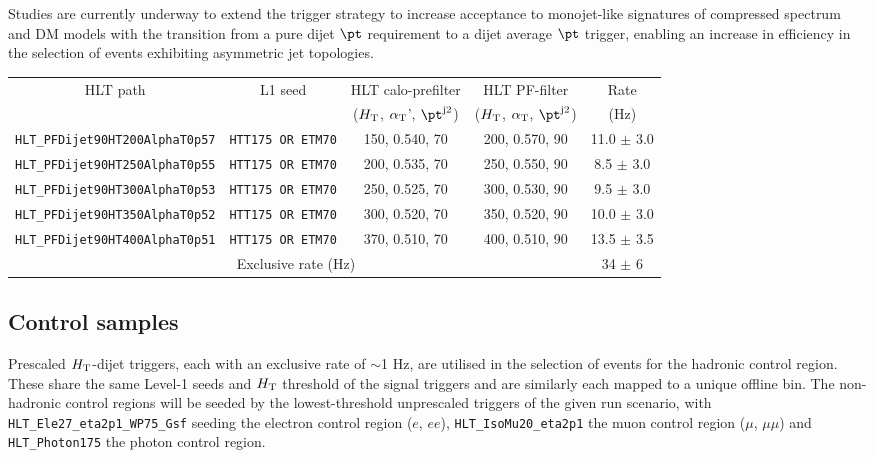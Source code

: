 Studies are currently underway to extend the trigger strategy to increase acceptance to monojet-like signatures of compressed spectrum and DM models with the transition from a pure dijet $\pt$ requirement to a dijet average $\pt$ trigger, enabling an increase in efficiency in the selection of events exhibiting asymmetric jet topologies.


\begin{table}[h!]
\footnotesize
\centering
\begin{tabular}{c|ccc|c} 
\hline
\hline
HLT path & L1 seed & HLT calo-prefilter                      & HLT PF-filter                          & Rate \\[0.7 ex] 
         &         & ($\mbox{$H_\text{T}$}$, $\alpha_{\text{T}}$', $\pt^{\rm j2}$) & ($\mbox{$H_\text{T}$}$, $\alpha_{\text{T}}$, $\pt^{\rm j2}$) & (Hz) \\[0.7 ex] 
\hline
\verb!HLT_PFDijet90HT200AlphaT0p57! & \verb!HTT175 OR ETM70! & 150, 0.540, 70 & 200, 0.570, 90 & 11.0 $\pm$ 3.0 \\
\verb!HLT_PFDijet90HT250AlphaT0p55! & \verb!HTT175 OR ETM70! & 200, 0.535, 70 & 250, 0.550, 90 & 8.5  $\pm$ 3.0 \\
\verb!HLT_PFDijet90HT300AlphaT0p53! & \verb!HTT175 OR ETM70! & 250, 0.525, 70 & 300, 0.530, 90 & 9.5  $\pm$ 3.0 \\
\verb!HLT_PFDijet90HT350AlphaT0p52! & \verb!HTT175 OR ETM70! & 300, 0.520, 70 & 350, 0.520, 90 & 10.0 $\pm$ 3.0 \\
\verb!HLT_PFDijet90HT400AlphaT0p51! & \verb!HTT175 OR ETM70! & 370, 0.510, 70 & 400, 0.510, 90 & 13.5 $\pm$ 3.5 \\
\hline
\multicolumn{4}{c|}{Exclusive rate (Hz)} & 34 $\pm$ 6 \\
\hline
\hline

\end{tabular}
\label{tab:2015_Hadronic_Signal_Triggers}
\end{table}




\subsection{Control samples}
Prescaled $\mbox{$H_\text{T}$}$-dijet triggers, each with an exclusive rate of $\sim$1 Hz, are utilised in the selection of events for the hadronic control region. These share the same Level-1 seeds and $\mbox{$H_\text{T}$}$ threshold of the signal triggers and are similarly each mapped to a unique offline bin. The non-hadronic control regions will be seeded by the lowest-threshold unprescaled triggers of the given run scenario, with \verb!HLT_Ele27_eta2p1_WP75_Gsf! seeding the electron control region ($e$, $ee$), \verb!HLT_IsoMu20_eta2p1! the muon control region ($\mu$, $\mu\mu$) and \verb!HLT_Photon175! the photon control region.





